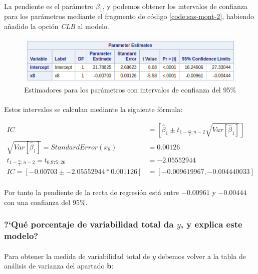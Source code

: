 \documentclass{article}
\begin{document}
  \paragraph{}
  La pendiente es el parámetro $\beta_1$, y podemos obtener los intervalos de confianza para los parámetros mediante el fragmento de código \ref{code:sas-mont-2}, habiendo añadido la opción \textit{CLB} al modelo.

  \begin{figure}[H]
    \centering
    \includegraphics[width=.6\linewidth]{img/montgomery/icestim.png}
    \caption{Estimadores para los parámetros con intervalos de confianza del 95\%}
  \end{figure}

  \paragraph{}
  Estos intervalos se calculan mediante la siguiente fórmula:

  \begin{align}
    IC &= \left[ \hat\beta_1 \pm t_{1-\frac{\alpha}{2};n-2} \sqrt{Var[\hat\beta_1]} \right]\\
    \sqrt{Var[\hat\beta_1]} = Standard Error(x_8) &= 0.00126\\
    t_{1-\frac{\alpha}{2};n-2} = t_{0.975;26} &= -2.05552944\\
    IC = \left[ -0.00703 \pm -2.05552944*0.001126 \right] &= [-0.009619967, -0.004440033]
  \end{align}

  \paragraph{}
  Por tanto la pendiente de la recta de regresión está entre $-0.00961$ y $-0.00444$ con una confianza del 95\%.

  \subsubsection{?`Qué porcentaje de variabilidad total da $y$, y explica este modelo?}

  \paragraph{}
  Para obtener la medida de variabilidad total de $y$ debemos volver a la tabla de análisis de varianza del apartado \textbf{b}:
\end{document}
